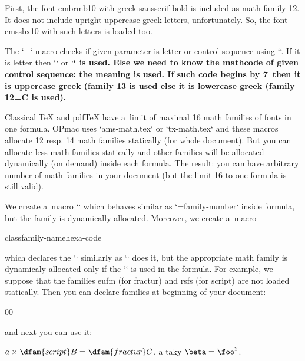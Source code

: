 First, the font cmbrmb10 with greek sansserif bold is included as math family 12. It does not include upright uppercase greek letters, unfortunately. So, the font cmssbx10 with such letters is loaded too. 



The `\_` macro checks if given parameter is letter or control sequence using `\string`. If it is letter then `\bi` or `\bf` is used. Else we need to know the mathcode of given control sequence: the {\tt{}}meaning is used. If such code begins by 7~then it is uppercase greek (family 13 is used{\tt{}} else it is  lowercase greek (family 12=C is used). 


 


Classical TeX and pdfTeX have a~limit of maximal 16 math families of fonts in one formula. OPmac uses `ams-math.tex` or `tx-math.tex` and these macros allocate 12 resp. 14 math families statically (for whole document). But you can allocate less math families statically and other families will be allocated dynamically (on demand) inside each formula. The result: you can have arbitrary number of math families in your document (but the limit 16 to one formula is still valid). 



We create a~macro `` which behaves similar as `\fam=family-number` inside formula, but the family is dynamically allocated. Moreover, we create a~macro 

\begtt
\dmathchardef \sequence class{family-name}hexa-code 
\endtt


which declares the `\sequence` similarly as `\matchardef` does it, but the appropriate math family is dynamicaly allocated only if the `\sequence` is used in the formula. For example, we suppose that the families eufm (for fractur) and rsfs (for script) are not loaded statically. Then you can declare families at beginning of your document: 

\begtt
   \def\fractur{\dfam{fractur}} 
    \def\script{\dfam{script}} 
\dmathchardef{}00  %
\endtt


and next you can use it: 

\begtt
$a \times {\script B} = {\fractur C}$, a taky $ \beta = \foo^2 $. 
\endtt


